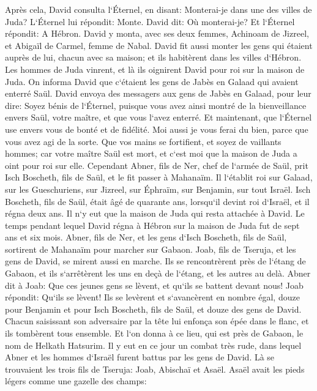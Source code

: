 \verse Après cela, David consulta l`Éternel, en disant: Monterai-je dans une des villes de Juda? L`Éternel lui répondit: Monte. David dit: Où monterai-je? Et l`Éternel répondit: A Hébron. 
\verse David y monta, avec ses deux femmes, Achinoam de Jizreel, et Abigaïl de Carmel, femme de Nabal. 
\verse David fit aussi monter les gens qui étaient auprès de lui, chacun avec sa maison; et ils habitèrent dans les villes d`Hébron. 
\verse Les hommes de Juda vinrent, et là ils oignirent David pour roi sur la maison de Juda. On informa David que c`étaient les gens de Jabès en Galaad qui avaient enterré Saül. 
\verse David envoya des messagers aux gens de Jabès en Galaad, pour leur dire: Soyez bénis de l`Éternel, puisque vous avez ainsi montré de la bienveillance envers Saül, votre maître, et que vous l`avez enterré. 
\verse Et maintenant, que l`Éternel use envers vous de bonté et de fidélité. Moi aussi je vous ferai du bien, parce que vous avez agi de la sorte. 
\verse Que vos mains se fortifient, et soyez de vaillants hommes; car votre maître Saül est mort, et c`est moi que la maison de Juda a oint pour roi sur elle. 
\verse Cependant Abner, fils de Ner, chef de l`armée de Saül, prit Isch Boscheth, fils de Saül, et le fit passer à Mahanaïm. 
\verse Il l`établit roi sur Galaad, sur les Gueschuriens, sur Jizreel, sur Éphraïm, sur Benjamin, sur tout Israël. 
\verse Isch Boscheth, fils de Saül, était âgé de quarante ans, lorsqu`il devint roi d`Israël, et il régna deux ans. Il n`y eut que la maison de Juda qui resta attachée à David. 
\verse Le temps pendant lequel David régna à Hébron sur la maison de Juda fut de sept ans et six mois. 
\verse Abner, fils de Ner, et les gens d`Isch Boscheth, fils de Saül, sortirent de Mahanaïm pour marcher sur Gabaon. 
\verse Joab, fils de Tseruja, et les gens de David, se mirent aussi en marche. Ils se rencontrèrent près de l`étang de Gabaon, et ils s`arrêtèrent les uns en deçà de l`étang, et les autres au delà. 
\verse Abner dit à Joab: Que ces jeunes gens se lèvent, et qu`ils se battent devant nous! Joab répondit: Qu`ils se lèvent! 
\verse Ils se levèrent et s`avancèrent en nombre égal, douze pour Benjamin et pour Isch Boscheth, fils de Saül, et douze des gens de David. 
\verse Chacun saisissant son adversaire par la tête lui enfonça son épée dans le flanc, et ils tombèrent tous ensemble. Et l`on donna à ce lieu, qui est près de Gabaon, le nom de Helkath Hatsurim. 
\verse Il y eut en ce jour un combat très rude, dans lequel Abner et les hommes d`Israël furent battus par les gens de David. 
\verse Là se trouvaient les trois fils de Tseruja: Joab, Abischaï et Asaël. Asaël avait les pieds légers comme une gazelle des champs: 
